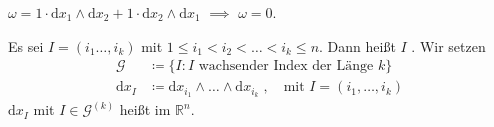\begin{example} \label{thm:12.9}
  $\omega = 1 \cdot \mathrm{d}x_1 \wedge \mathrm{d}x_2 + 1 \cdot \mathrm{d}x_2 \wedge \mathrm{d}x_1$ $\implies$ $\omega = 0$.
\end{example}

\begin{theorem}[Definition] \label{thm:12.10}
  Es sei $I = (i_1\ldots,i_k)$ mit $1 \leq i_1 < i_2 < \ldots < i_k \leq n$. Dann heißt $I$ . Wir setzen 
  \begin{align*}
    \mathcal{G} &\coloneq \{ I : I \text{ wachsender Index der Länge } k \} \\
    \mathrm{d}x_I &\coloneq \mathrm{d}x_{i_1} \wedge \ldots \wedge \mathrm{d}x_{i_k} \; , \quad \text{mit } I = (i_1,\ldots,i_k)
  \end{align*}
  $\mathrm{d}x_I$ mit $I \in \mathcal{G}^{(k)}$ heißt  im $\mathbb{R}^n$.
\end{theorem}

